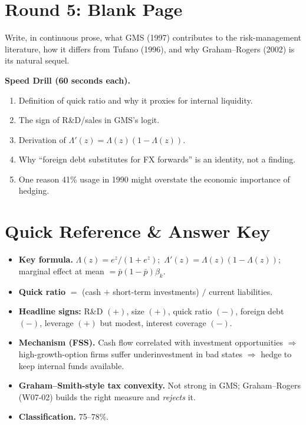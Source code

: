 \documentclass[11pt]{article}
\begin{document}
\section*{Round 5: Blank Page}
Write, in continuous prose, what GMS (1997) contributes to the risk-management literature, how it differs from Tufano (1996), and why Graham--Rogers (2002) is its natural sequel.

\vspace{6pt}
\begin{drillbox}
\textbf{Speed Drill (60 seconds each).}
\begin{enumerate}
\item Definition of quick ratio and why it proxies for internal liquidity.
\item The sign of R\&D/sales in GMS's logit.
\item Derivation of $\Lambda'(z)=\Lambda(z)(1-\Lambda(z))$.
\item Why ``foreign debt substitutes for FX forwards'' is an identity, not a finding.
\item One reason 41\% usage in 1990 might overstate the economic importance of hedging.
\end{enumerate}
\end{drillbox}

\section*{Quick Reference \& Answer Key}
\begin{answerbox}
\begin{itemize}
\item \textbf{Key formula.} $\Lambda(z)=e^z/(1+e^z)$;\ $\Lambda'(z)=\Lambda(z)(1-\Lambda(z))$; marginal effect at mean $=\bar p(1-\bar p)\beta_k$.
\item \textbf{Quick ratio} $=$ (cash $+$ short-term investments) $/$ current liabilities.
\item \textbf{Headline signs:} R\&D $(+)$, size $(+)$, quick ratio $(-)$, foreign debt $(-)$, leverage $(+)$ but modest, interest coverage $(-)$.
\item \textbf{Mechanism (FSS).} Cash flow correlated with investment opportunities $\Rightarrow$ high-growth-option firms suffer underinvestment in bad states $\Rightarrow$ hedge to keep internal funds available.
\item \textbf{Graham--Smith-style tax convexity.} Not strong in GMS; Graham--Rogers (W07-02) builds the right measure and \emph{rejects} it.
\item \textbf{Classification.} 75--78\%.
\end{itemize}
\end{answerbox}
\end{document}

